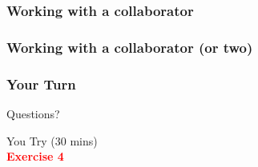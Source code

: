 \documentclass{beamer}
\begin{document}
\begin{frame}
\frametitle{Working with a collaborator}
\begin{center}
\end{center}
\end{frame}

\begin{frame}
\frametitle{Working with a collaborator (or two)}
\begin{center}
\end{center}
\end{frame}

\begin{frame}
\frametitle{Your Turn}
\begin{center}
Questions? \pause
\vspace{30pt}

You Try (30 mins)\\
\textbf{\textcolor{red}{Exercise 4}}
\end{center}
\end{frame}
\end{document}
